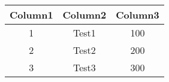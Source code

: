 \documentclass{article}
\begin{document}
\begin{tabular}{|c|c|c|}
\hline
Column1 & Column2 & Column3 \\
\hline
1 & Test1 & 100 \\
\hline
2 & Test2 & 200 \\
\hline
3 & Test3 & 300 \\
\hline
\end{tabular}
\end{document}
